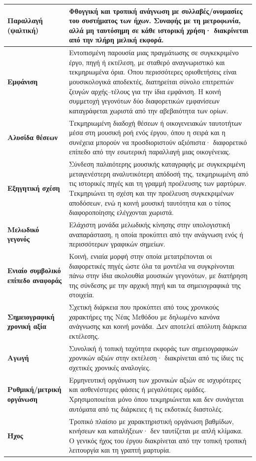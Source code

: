 \documentclass[11pt,a4paper]{article}
\begin{document}
{\begin{xltabular}{\textwidth}{@{}>{\RaggedRight\arraybackslash}p{0.23\textwidth}Y@{}}
\midrule
\textbf{Παραλλαγή (ψαλτική)} & Φθογγική και τροπική ανάγνωση με συλλαβές/ονομασίες του συστήματος των ήχων. Συναφής με τη μετροφωνία, αλλά μη ταυτόσημη σε κάθε ιστορική χρήση· διακρίνεται από την πλήρη μελική εκφορά.\tabularnewline
\midrule
\textbf{Εμφάνιση} & Εντοπισμένη παρουσία μιας πραγμάτωσης σε συγκεκριμένο έργο, πηγή ή εκτέλεση, με σταθερό αναγνωριστικό και τεκμηριωμένα όρια. Όπου περισσότερες οριοθετήσεις είναι μουσικολογικά αποδεκτές, διατηρείται σύνολο επιτρεπτών ζευγών αρχής--τέλους για την ίδια εμφάνιση. Η κοινή συμμετοχή γεγονότων δύο διαφορετικών εμφανίσεων καταγράφεται χωριστά από την αβεβαιότητα των ορίων.\tabularnewline
\midrule
\textbf{Αλυσίδα θέσεων} & Τεκμηριωμένη διαδοχή θέσεων ή οικογενειακών ταυτοτήτων μέσα στη μουσική ροή ενός έργου, όπου η σειρά και η συνέχεια μπορούν να προσδιοριστούν αξιόπιστα· διαφορετικό επίπεδο από την εσωτερική παραλλαγή μιας οικογένειας.\tabularnewline
\midrule
\textbf{Εξηγητική σχέση} & Σύνδεση παλαιότερης μουσικής καταγραφής με συγκεκριμένη μεταγενέστερη αναλυτικότερη απόδοσή της, τεκμηριωμένη από τις ιστορικές πηγές και τη γραμμή προέλευσης των μαρτύρων. Τεκμηριώνει τη σχέση και την προέλευση συγκεκριμένων αποδόσεων, ενώ η κοινή μουσική ταυτότητα και ο τύπος διαφοροποίησης ελέγχονται χωριστά.\tabularnewline
\midrule
\textbf{Μελωδικό γεγονός} & Ελάχιστη μονάδα μελωδικής κίνησης στην υπολογιστική αναπαράσταση, η οποία προκύπτει από την ανάγνωση ενός ή περισσότερων γραφικών σημείων.\tabularnewline
\midrule
\textbf{Ενιαίο συμβολικό επίπεδο αναφοράς} & Κοινή, ενιαία μορφή στην οποία μετατρέπονται οι διαφορετικές πηγές ώστε όλα τα μοντέλα να συγκρίνονται πάνω στην ίδια ακολουθία μουσικών γεγονότων, με διατήρηση της σύνδεσης με την αρχική πηγή και τα σημειογραφικά της στοιχεία.\tabularnewline
\midrule
\textbf{Σημειογραφική χρονική αξία} & Σχετική διάρκεια που προκύπτει από τους χρονικούς χαρακτήρες της Νέας Μεθόδου με δηλωμένο κανόνα ανάγνωσης και κοινή μονάδα. Δεν αποτελεί απόλυτη διάρκεια εκτέλεσης.\tabularnewline
\midrule
\textbf{Αγωγή} & Συνολική ή τοπική ταχύτητα εκφοράς των σημειογραφικών χρονικών αξιών στην εκτέλεση· διακρίνεται από τις ίδιες τις σχετικές χρονικές αναλογίες.\tabularnewline
\midrule
\textbf{Ρυθμική/μετρική οργάνωση} & Ερμηνευτική οργάνωση των χρονικών αξιών σε ισχυρότερες και ασθενέστερες φάσεις ή μεγαλύτερες ομάδες. Χρησιμοποιείται μόνο όπου τεκμηριώνεται και δεν συνάγεται αυτόματα από τις διάρκειες ή τις εκδοτικές διαστολές.\tabularnewline
\midrule
\textbf{Ήχος} & Τροπικό πλαίσιο με χαρακτηριστική οργάνωση βαθμίδων, κινήσεων και καταλήξεων· δεν ταυτίζεται με απλή κλίμακα. Ο γενικός ήχος του έργου διακρίνεται από την τοπική τροπική λειτουργία και τη γραπτή μαρτυρία.\tabularnewline

\end{xltabular}}
\end{document}

